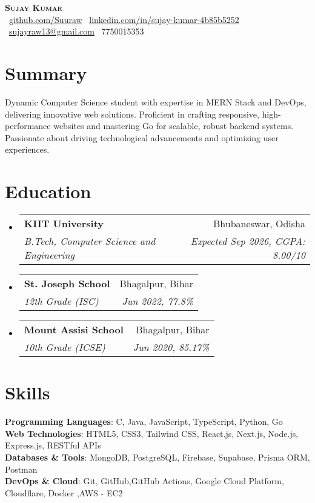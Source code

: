 \documentclass[letterpaper,11pt]{article}
\makeatletter
\newcommand{\resumeSubheading}[4]{
  \vspace{-4pt}\item
  \begin{tabular*}{0.98\textwidth}[t]{l@{\extracolsep{\fill}}r}
    \textbf{\color{black}#1} & \color{black}#2 \\
    \textit{\small\color{black}#3} & \textit{\small\color{black} #4} \\
  \end{tabular*}\vspace{-8pt}
}
\newcommand{\resumeSubHeadingListStart}{\begin{itemize}[leftmargin=0.1in, label={}]}
\newcommand{\resumeSubHeadingListEnd}{\end{itemize}\vspace{-8pt}}
\makeatother
\begin{document}
\begin{center}
  \textbf{\Huge \scshape \color{black}Sujay Kumar} \\ \vspace{12pt}
  \small\color{black}
  \vspace{10pt}
  \faGithub\ \href{https://github.com/Suuraw}{github.com/Suuraw} \quad
  \faLinkedin\ \href{https://linkedin.com/in/sujay-kumar-4b85b5252}{linkedin.com/in/sujay-kumar-4b85b5252} \quad
  \faEnvelope\ \href{mailto:sujayraw13@gmail.com}{sujayraw13@gmail.com} \quad
  \faPhone\ 7750015353
\end{center}
\vspace{-10pt}
\section{Summary}
\vspace{6pt}
\resumeSubHeadingListStart
  \small{\item{\color{black}Dynamic Computer Science student with expertise in MERN Stack and DevOps, delivering innovative web solutions. Proficient in crafting responsive, high-performance websites and mastering Go for scalable, robust backend systems. Passionate about driving technological advancements and optimizing user experiences.}}
\resumeSubHeadingListEnd

\section{Education}
\vspace{6pt}
\resumeSubHeadingListStart
  \resumeSubheading{KIIT University}{Bhubaneswar, Odisha}{B.Tech, Computer Science and Engineering}{Expected Sep 2026, CGPA: 8.00/10}
  \resumeSubheading{St. Joseph School}{Bhagalpur, Bihar}{12th Grade (ISC)}{Jun 2022, 77.8\%}
  \resumeSubheading{Mount Assisi School}{Bhagalpur, Bihar}{10th Grade (ICSE)}{Jun 2020, 85.17\%}
\resumeSubHeadingListEnd

\section{Skills}
\vspace{6pt}
\resumeSubHeadingListStart
  \small{\item{\color{black}
    \textbf{Programming Languages}: C, Java, JavaScript, TypeScript, Python, Go \\ \vspace{2pt}
    \textbf{Web Technologies}: HTML5, CSS3, Tailwind CSS, React.js, Next.js, Node.js, Express.js, RESTful APIs \\ \vspace{2pt}
    \textbf{Databases \& Tools}: MongoDB, PostgreSQL, Firebase, Supabase, Prisma ORM, Postman \\  \vspace{2pt}
    \textbf{DevOps \& Cloud}: Git, GitHub,GitHub Actions, Google Cloud Platform, Cloudflare, Docker ,AWS - EC2
  }}
\resumeSubHeadingListEnd
\end{document}
